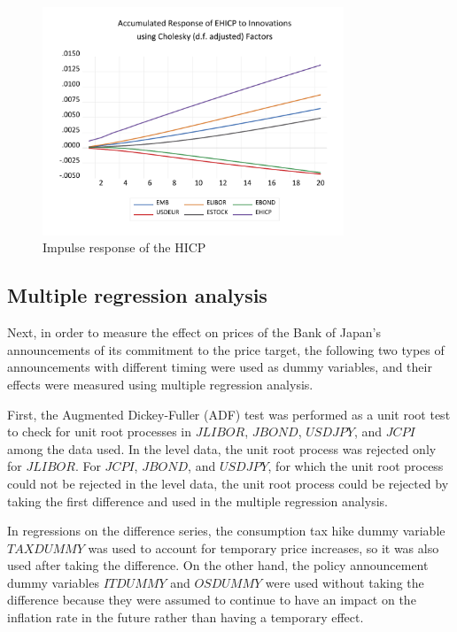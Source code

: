 \documentclass[12pt]{article}
\begin{document}
\begin{figure}[!htbp]
\begin{minipage}{0.5\hsize}
\begin{center}
        \end{center}
    \end{minipage}
    \begin{minipage}{0.5\hsize}
        \caption{Impulse response of the HICP}
        \begin{center}
            \includegraphics[width=9cm]{iehicp.pdf}
        \end{center}
    \end{minipage}
\end{figure}

\newpage

\subsection{Multiple regression analysis}

Next, in order to measure the effect on prices of the Bank of Japan's announcements of its commitment to the price target, the following two types of announcements with different timing were used as dummy variables, and their effects were measured using multiple regression analysis.

First, the Augmented Dickey-Fuller (ADF) test was performed as a unit root test to check for unit root processes in $JLIBOR$, $JBOND$, $USDJPY$, and $JCPI$ among the data used.
In the level data, the unit root process was rejected only for $JLIBOR$.
For $JCPI$, $JBOND$, and $USDJPY$, for which the unit root process could not be rejected in the level data, the unit root process could be rejected by taking the first difference and used in the multiple regression analysis.

In regressions on the difference series, the consumption tax hike dummy variable $TAXDUMMY$ was used to account for temporary price increases, so it was also used after taking the difference.
On the other hand, the policy announcement dummy variables $ITDUMMY$ and $OSDUMMY$ were used without taking the difference because they were assumed to continue to have an impact on the inflation rate in the future rather than having a temporary effect.
\end{document}
